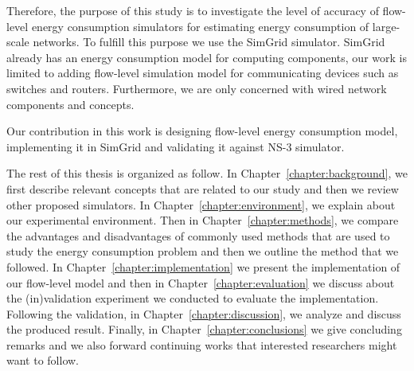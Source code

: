 Therefore, the purpose of this study is to investigate the level of accuracy of flow-level energy consumption simulators for estimating energy consumption of large-scale networks. To fulfill this purpose we use the SimGrid simulator. SimGrid already has an energy consumption model for computing components, our work is limited to adding flow-level simulation model for communicating devices such as switches and routers. Furthermore, we are only concerned with wired network components and concepts. 

Our contribution in this work is designing flow-level energy consumption model,  implementing it in SimGrid and validating it against NS-3 simulator. 

The rest of this thesis is organized as follow. In Chapter~\ref{chapter:background}, we first describe relevant concepts that are related to our study and then we review other proposed simulators. In Chapter~\ref{chapter:environment}, we explain about our experimental environment. Then in Chapter~\ref{chapter:methods}, we compare the advantages and disadvantages of commonly used methods that are used to study the energy consumption problem and then we outline the method that we followed. In Chapter~\ref{chapter:implementation} we present the implementation of our flow-level model and then in Chapter~\ref{chapter:evaluation} we discuss about the (in)validation experiment we conducted to evaluate the implementation. Following the validation, in Chapter~\ref{chapter:discussion}, we analyze and discuss the produced result. Finally, in Chapter~\ref{chapter:conclusions} we give concluding remarks and we also forward continuing works that interested researchers might want to follow.


